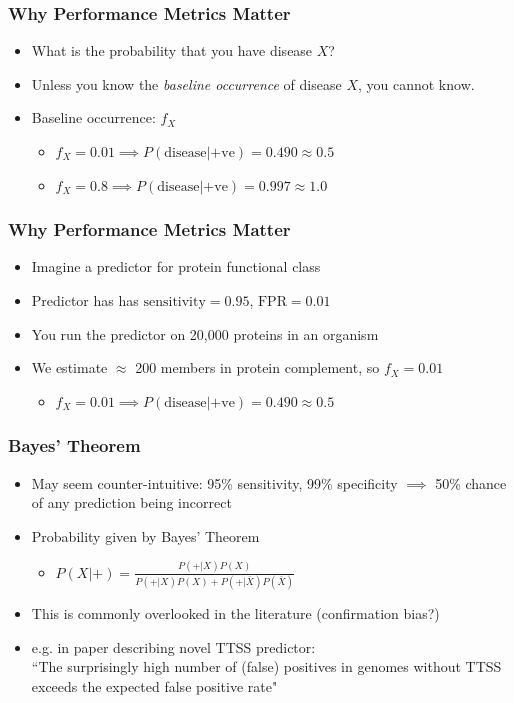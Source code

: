 \documentclass[table]{beamer}
\begin{document}
    \begin{frame}
     \frametitle{Why Performance Metrics Matter}
     \begin{itemize}
       \item<1-> What is the probability that you have disease $X$?
       \item<1-> Unless you know the \emph{baseline occurrence} of disease $X$, you cannot know.
       \item<2-> Baseline occurrence: $f_X$
       \begin{itemize}
         \item $f_X = 0.01 \implies P(\text{disease}|\text{+ve}) = 0.490 \approx 0.5$
         \item $f_X = 0.8 \implies P(\text{disease}|\text{+ve}) = 0.997 \approx 1.0$         
       \end{itemize}
     \end{itemize} 
   \end{frame}

    \begin{frame}
     \frametitle{Why Performance Metrics Matter}
     \begin{itemize}
       \item<1-> Imagine a predictor for protein functional class
       \item<1-> Predictor has has $\text{sensitivity}=0.95$, $\text{FPR}=0.01$
       \item<1-> You run the predictor on 20,000 proteins in an organism
       \item<2-> We estimate $\approx$ 200 members in protein complement, so $f_X=0.01$
       \begin{itemize}
         \item $f_X = 0.01 \implies P(\text{disease}|\text{+ve}) = 0.490 \approx 0.5$
       \end{itemize}
     \end{itemize} 
   \end{frame}

    \begin{frame}
     \frametitle{Bayes' Theorem}
     \begin{itemize}
       \item May seem counter-intuitive: 95\% sensitivity, 99\% specificity $\implies$ 50\% chance of any prediction being incorrect
       \item Probability given by Bayes' Theorem
       \begin{itemize}
         \item $P(X|+) =  \frac{P(+|X) P(X)}{P(+|X) P(X) + P(+|\bar{X}) P(\bar{X})}$
       \end{itemize}
       \item This is commonly overlooked in the literature (confirmation bias?)
       \item e.g. in paper describing novel TTSS predictor: \\
         ``The surprisingly high number of (false) positives in genomes without TTSS exceeds the expected false positive rate"
     \end{itemize} 
   \end{frame}
\end{document}
